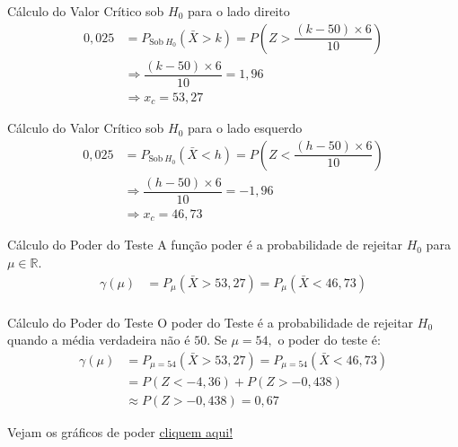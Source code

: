 \documentclass[12pt]{beamer}
\begin{document}
\begin{frame}{}
	\begin{block}{Cálculo do Valor Crítico sob $H_{0}$ para o lado direito}
		\justifying
		\begin{align*}
			0,025&=P_{\text{Sob}~H_{0}}(\bar{X}>k)=P(Z>\dfrac{(k-50)\times6}{10})\\
			&\Rightarrow \dfrac{(k-50)\times6}{10}=1,96\\
			&\Rightarrow x_{c}=53,27
		\end{align*}
	\end{block}
	\pause
	\begin{block}{Cálculo do Valor Crítico sob $H_{0}$ para o lado esquerdo}
		\justifying
		\begin{align*}
			0,025&=P_{\text{Sob}~H_{0}}(\bar{X}<h)=P(Z<\dfrac{(h-50)\times6}{10})\\
			&\Rightarrow \dfrac{(h-50)\times6}{10}=-1,96\\
			&\Rightarrow x_{c}=46,73
		\end{align*}
	\end{block}
\end{frame}

\begin{frame}{}
	\begin{block}{Cálculo do Poder do Teste}
		\justifying
		A função poder é a probabilidade de rejeitar \( H_0 \) para $\mu\in \mathbb{R}.$
		\begin{align*}
			\gamma(\mu)&=P_{\mu}(\bar{X}>53,27)=P_{\mu}(\bar{X}<46,73)\\
		\end{align*}
	\end{block}
	\pause
	\begin{block}{Cálculo do Poder do Teste}
		\justifying
		O poder do Teste é a probabilidade de rejeitar $H_{0}$ quando a média verdadeira não é $50.$ Se $\mu=54,$ o poder do teste é:
		\begin{align*}
			\gamma(\mu)&=P_{\mu = 54}(\bar{X}>53,27)=P_{\mu = 54}(\bar{X}<46,73)\\
			&=P(Z < -4,36) + P(Z > -0,438)\\
			&\approx P(Z > -0,438) = 0,67
		\end{align*}
	\end{block}
	\nocite{hogg}
\end{frame}

\begin{frame}{}
	\begin{block}{}
		Vejam os gráficos de poder \href{https://est711.shinyapps.io/FuncaoPoder/}{cliquem aqui!}
	\end{block}
\end{frame}
\end{document}
